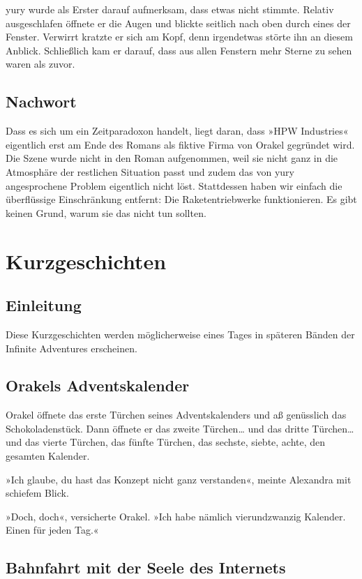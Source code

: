 yury wurde als Erster darauf aufmerksam, dass etwas nicht stimmte. Relativ ausgeschlafen öffnete er die Augen und blickte seitlich nach oben durch eines der Fenster. Verwirrt kratzte er sich am Kopf, denn irgendetwas störte ihn an diesem Anblick. Schließlich kam er darauf, dass aus allen Fenstern mehr Sterne zu sehen waren als zuvor.

\section{Nachwort}

Dass es sich um ein Zeitparadoxon handelt, liegt daran, dass »HPW Industries« eigentlich erst am Ende des Romans als fiktive Firma von Orakel gegründet wird. Die Szene wurde nicht in den Roman aufgenommen, weil sie nicht ganz in die Atmosphäre der restlichen Situation passt und zudem das von yury angesprochene Problem eigentlich nicht löst. Stattdessen haben wir einfach die überflüssige Einschränkung entfernt: Die Raketentriebwerke funktionieren. Es gibt keinen Grund, warum sie das nicht tun sollten.


\chapter{Kurzgeschichten}

\section{Einleitung}

Diese Kurzgeschichten werden möglicherweise eines Tages in späteren Bänden der Infinite Adventures erscheinen.

\section{Orakels Adventskalender}

Orakel öffnete das erste Türchen seines Adventskalenders und aß genüsslich das Schokoladenstück. Dann öffnete er das zweite Türchen… und das dritte Türchen… und das vierte Türchen, das fünfte Türchen, das sechste, siebte, achte, den gesamten Kalender.

»Ich glaube, du hast das Konzept nicht ganz verstanden«, meinte Alexandra mit schiefem Blick.

»Doch, doch«, versicherte Orakel. »Ich habe nämlich vierundzwanzig Kalender. Einen für jeden Tag.«


\section{Bahnfahrt mit der Seele des Internets}

